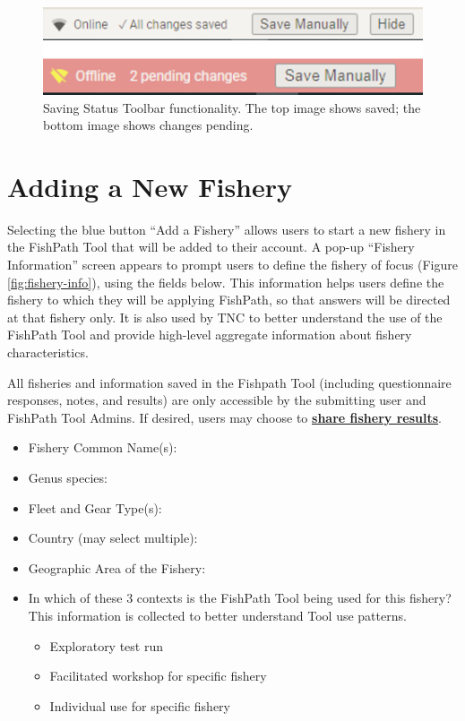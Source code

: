 \documentclass[
  11pt,
]{book}
\providecommand{\tightlist}{%
  \setlength{\itemsep}{0pt}\setlength{\parskip}{0pt}}
\begin{document}
\begin{figure}

{\centering \includegraphics[width=0.95\linewidth]{images/saving-status-toolbar} 

}

\caption{Saving Status Toolbar functionality. The top image shows saved; the bottom image shows changes pending.}\label{fig:saving-status}
\end{figure}

\hypertarget{adding-a-new-fishery}{%
\section{Adding a New Fishery}\label{adding-a-new-fishery}}

Selecting the blue button ``Add a Fishery'' allows users to start a new fishery in the FishPath Tool that will be added to their account. A pop-up ``Fishery Information'' screen appears to prompt users to define the fishery of focus (Figure \ref{fig:fishery-info}), using the fields below. This information helps users define the fishery to which they will be applying FishPath, so that answers will be directed at that fishery only. It is also used by TNC to better understand the use of the FishPath Tool and provide high-level aggregate information about fishery characteristics.

All fisheries and information saved in the Fishpath Tool (including questionnaire responses, notes, and results) are only accessible by the submitting user and FishPath Tool Admins. If desired, users may choose to \protect\hyperlink{Results-Actions}{\textbf{share fishery results}}.

\begin{itemize}
\tightlist
\item
  Fishery Common Name(s):
\item
  Genus species:
\item
  Fleet and Gear Type(s):
\item
  Country (may select multiple):
\item
  Geographic Area of the Fishery:
\item
  In which of these 3 contexts is the FishPath Tool being used for this fishery? This information is collected to better understand Tool use patterns.

  \begin{itemize}
  \tightlist
  \item
    Exploratory test run\\
  \item
    Facilitated workshop for specific fishery
  \item
    Individual use for specific fishery
  \end{itemize}
\end{itemize}
\end{document}
